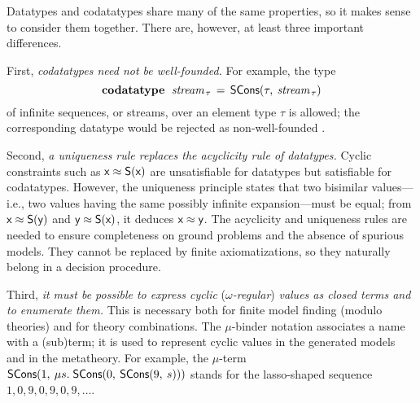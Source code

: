 Datatypes and codatatypes share many of the same properties, so it makes sense
to consider them together. There are, however, at least three important
differences.

First, \emph{codatatypes need not be well-founded.}
For example, the type
%
\[\textbf{codatatype}~\;\textit{stream}_{\,\tau} \,=\, \textsf{SCons}(\tau,\: \textit{stream}_{\,\tau})\]
%
of infinite sequences, or streams, over an element type $\tau$ is allowed; the
corresponding datatype would be rejected as non-well-founded \cite{blanchette-et-al-2015-esop}.

Second, \emph{a uniqueness rule replaces the acyclicity rule of datatypes.}
Cyclic constraints such as
$\textsf{x} \approx \textsf{S}(\textsf{x})$ %
are unsatisfiable for datatypes but satisfiable for codatatypes.
However, the uniqueness principle states that two bisimilar values---i.e., two values
having the same possibly infinite expansion---must be equal; from $\textsf{x}
\approx \textsf{S}(\textsf{y})$ and
$\textsf{y} \approx \textsf{S}(\textsf{x})$, it deduces $\textsf{x} \approx \textsf{y}$.
The acyclicity and uniqueness rules are needed to ensure completeness on
ground problems and the absence of spurious models. They cannot be replaced by
finite axiomatizations, so they naturally belong in a decision procedure.

Third, \emph{it must be possible to express cyclic }(\emph{$\omega$-regular}) \emph{values as closed terms and
to enumerate them.} This is necessary both for finite model finding (modulo theories)
and for theory combinations. The $\mu$-binder notation associates a name with
a (sub)term; it is used to represent cyclic values in the generated models and
in the metatheory. For example,
the $\mu$-term $\textsf{SCons}(1,\: \mu s.\; \textsf{SCons}(0,\: \textsf{SCons}(9,\: s)))$
stands for the lasso-shaped sequence $1, 0, 9, 0, 9, 0, 9, \ldots$\afterLdots.



